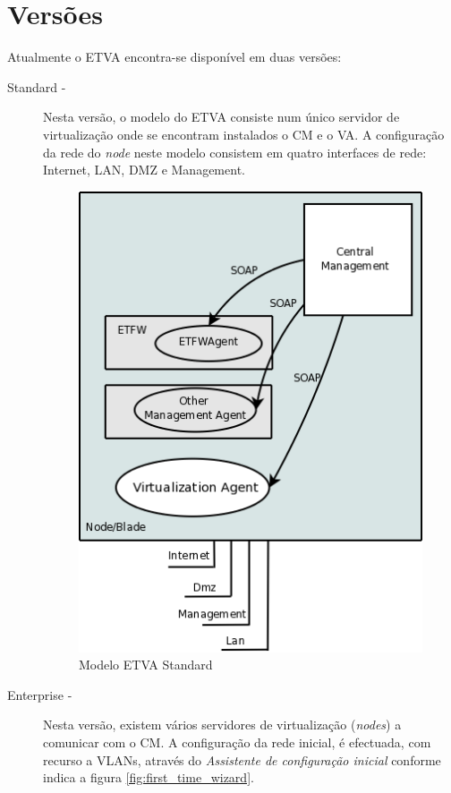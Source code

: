 \section{Versões}

Atualmente o ETVA encontra-se disponível em duas versões:
\begin{description}
	\item[Standard -] Nesta versão, o modelo do ETVA consiste num único servidor de virtualização onde se encontram instalados o CM e o VA. A configuração da rede do \emph{node} neste modelo consistem em quatro interfaces de rede: Internet, LAN, DMZ e Management.
		\begin{figure}[H]
			\begin{center}
			\includegraphics[scale=0.4]{screenshots/etva_standard.png}
			\caption{Modelo ETVA Standard}
			\label{fig:etva_standard}
			\end{center}
		\end{figure}
	\item[Enterprise -] Nesta versão, existem vários servidores de virtualização (\emph{nodes}) a comunicar com o CM. A configuração da rede inicial, é efectuada, com recurso a VLANs, através do \emph{Assistente de configuração inicial} conforme indica a figura \ref{fig:first_time_wizard}.
		\begin{figure}[H]

\end{figure}
\end{description}
